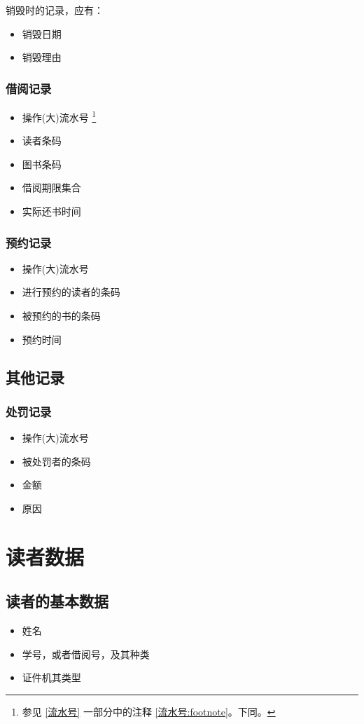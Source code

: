 \documentclass[UTF8]{ctexrep}
\begin{document}
    销毁时的记录，应有：
    \begin{itemize}
        \item 销毁日期
        \item 销毁理由
    \end{itemize}
    \subsection{借阅记录}
    \begin{itemize}
        \item 操作(大)流水号 \footnote{\label{参见}
            参见  \ref{流水号} 一部分中的注释 \ref{流水号:footnote}。下同。}
        \item 读者条码
        \item 图书条码
        \item 借阅期限集合
        \item 实际还书时间
    \end{itemize}
    \subsection{预约记录}
    \begin{itemize}
        \item 操作(大)流水号  
        \item 进行预约的读者的条码
        \item 被预约的书的条码
        \item 预约时间
    \end{itemize}
    \section{其他记录}
    \subsection{处罚记录}
    \begin{itemize}
        \item 操作(大)流水号
        \item 被处罚者的条码
        \item 金额
        \item 原因
    \end{itemize}
    \chapter{读者数据}
    \section{读者的基本数据}
    \begin{itemize}
    	\item 姓名
    	\item 学号，或者借阅号，及其种类
    	\item 证件机其类型
    \end{itemize}
\end{document}
